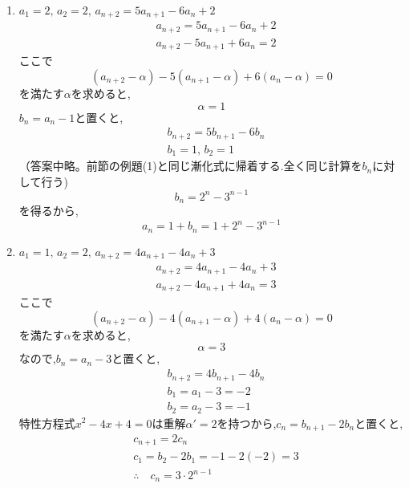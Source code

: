     \noindent{}
    \begin{enumerate}[label=(\arabic*),parsep=3pt,format=\bookitemlink{example-three-term-2}{solution}{problem}]
      \item $\displaystyle a_1=2,\,a_2=2,\, a_{n+2}=5a_{n+1}-6a_n+2$
            \begin{align*}
              &a_{n+2}=5a_{n+1}-6a_n+2\\
              &a_{n+2}-5a_{n+1}+6a_n=2
            \end{align*}
            ここで
            \[
              (a_{n+2}-\alpha)-5(a_{n+1}-\alpha)+6(a_n-\alpha)=0 
            \]
            を満たす$\alpha$を求めると,
            \[
              \alpha=1
            \]
            $b_n=a_n-1$と置くと,
            \begin{align*}
              &b_{n+2}=5b_{n+1}-6b_n\\
              &b_1=1,\, b_2=1
            \end{align*}
            （答案中略。前節の例題(1)と同じ漸化式に帰着する.全く同じ計算を$b_n$に対して行う)
            \[
              b_n=2^n-3^{n-1}
            \]
            を得るから,
            \[
              a_n=1+b_n=1+2^n-3^{n-1}
            \]
      \item $\displaystyle a_1=1,\,a_2=2,\, a_{n+2}=4a_{n+1}-4a_n+3$
            \begin{align*}
              &a_{n+2}=4a_{n+1}-4a_n+3\\
              &a_{n+2}-4a_{n+1}+4a_n=3
            \end{align*}
            ここで
            \[
              (a_{n+2}-\alpha)-4(a_{n+1}-\alpha)+4(a_n-\alpha)=0 
            \]
            を満たす$\alpha$を求めると,
            \[
              \alpha=3
            \]
            なので,$b_n=a_n-3$と置くと,
            \begin{align*}
              &b_{n+2}=4b_{n+1}-4b_n\\
              &b_1=a_1-3=-2\\
              &b_2=a_2-3=-1                
            \end{align*}
            特性方程式$x^2-4x+4=0$は重解$\alpha'=2$を持つから,$c_n=b_{n+1}-2b_n$と置くと,
            \begin{align*}
              &c_{n+1}=2c_n\\
              &c_1=b_2-2b_1=-1-2(-2)=3\\
              &\therefore \quad c_n=3\cdot2^{n-1}

\end{align*}
\end{enumerate}
